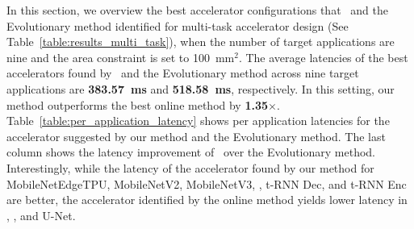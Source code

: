 \begin{table}[t!]
\small
\renewcommand{\arraystretch}{1.2}
\centering
\caption{Optimized accelerator configurations (See Table~\ref{tab:arch_params}) found by \primemethodname\ and the Evolutionary method for multi-task accelerator design (nine applications and area constraint 100~mm$^2$). Last row shows the accelerator area in mm$^2$. \primemethodname\ reduces the overall chip area usage by 1.97$\times$. The difference in the accelerator configurations are shaded in gray.}
\label{table:best_accelerator_config}
\end{table}
%
In this section, we overview the best accelerator configurations that \primemethodname\ and the Evolutionary method identified for multi-task accelerator design (See Table~\ref{table:results_multi_task}), when the number of target applications are nine and the area constraint is set to 100~mm$^2$.
%
The average latencies of the best accelerators found by \primemethodname\ and the Evolutionary method across nine target applications are \textbf{383.57~ms} and \textbf{518.58~ms}, respectively.
%
In this setting, our method outperforms the best online method by \textbf{1.35$\times$}.
%
Table~\ref{table:per_application_latency} shows per application latencies for the accelerator suggested by our method and the Evolutionary method.
%
The last column shows the latency improvement of \primemethodname\ over the Evolutionary method. Interestingly, while the latency of the accelerator found by our method for MobileNetEdgeTPU, MobileNetV2, MobileNetV3, \mfour, t-RNN Dec, and t-RNN Enc are better, the accelerator identified by the online method yields lower latency in \mfive, \msix, and U-Net.

